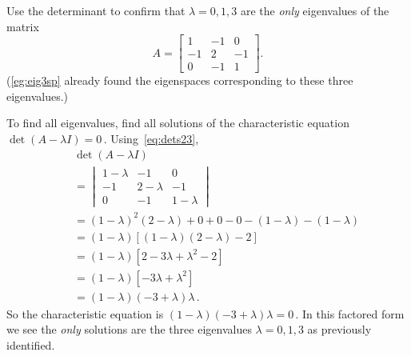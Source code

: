 \begin{example} \label{eg:eig3introval}
Use the determinant to confirm that \(\lambda=0,1,3\) are the \emph{only} eigenvalues of the matrix
\begin{equation*}
A=\begin{bmatrix} 1&-1&0\\-1&2&-1\\0&-1&1 \end{bmatrix}.
\end{equation*}
(\autoref{eg:eig3sp} already found the eigenspaces corresponding to these three eigenvalues.)
\begin{solution} 
To find all eigenvalues, find all solutions of the characteristic equation \(\det(A-\lambda I)=0\)\,.  
Using~\eqref{eq:dets23},
\begin{eqnarray*}
&&\det(A-\lambda I)
\\&&{}=\begin{vmatrix} 1-\lambda&-1&0\\-1&2-\lambda&-1\\0&-1&1-\lambda \end{vmatrix}
\\&&{}=(1-\lambda)^2(2-\lambda)+0+0-0-(1-\lambda)-(1-\lambda)
\\&&{}=(1-\lambda)\left[(1-\lambda)(2-\lambda)-2\right]
\\&&{}=(1-\lambda)\left[2-3\lambda+\lambda^2-2\right]
\\&&{}=(1-\lambda)\left[-3\lambda+\lambda^2\right]
\\&&{}=(1-\lambda)(-3+\lambda)\lambda\,.
\end{eqnarray*}
So the characteristic equation is \((1-\lambda)(-3+\lambda)\lambda=0\)\,. 
In this factored form we see the \emph{only} solutions are the three eigenvalues \(\lambda=0,1,3\) as previously identified.
\end{solution}
\end{example}



